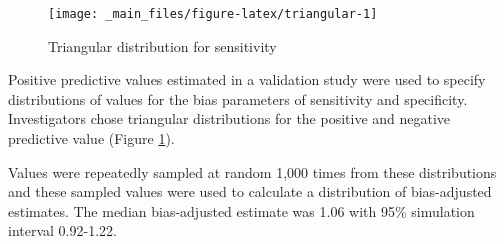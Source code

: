 \documentclass[
]{book}
\begin{document}
\begin{figure}

{\centering \texttt{[image: \_main\_files/figure-latex/triangular-1]} 

}

\caption{Triangular distribution for sensitivity}\label{fig:triangular}
\end{figure}

Positive predictive values estimated in a validation study were used to specify distributions of values for the bias parameters of sensitivity and specificity. Investigators chose triangular distributions for the positive and negative predictive value (Figure \ref{fig:triangular}).

Values were repeatedly sampled at random 1,000 times from these distributions and these sampled values were used to calculate a distribution of bias-adjusted estimates. The median bias-adjusted estimate was 1.06 with 95\% simulation interval 0.92-1.22.

  
\end{document}
